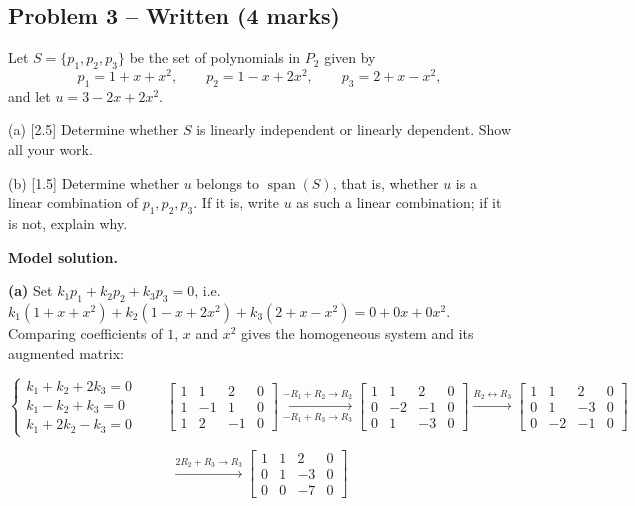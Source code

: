\documentclass[11pt,a4paper]{article}
\begin{document}
\subsection*{Problem 3 -- Written (4 marks)}
Let $S=\{p_1,p_2,p_3\}$ be the set of polynomials in $P_2$ given by\[p_1=1+x+x^{2},\qquad p_2=1-x+2x^{2},\qquad p_3=2+x-x^{2},\]and let $u=3-2x+2x^{2}$.\par (a) [2.5] Determine whether $S$ is linearly independent or linearly dependent. Show all your work.\par (b) [1.5] Determine whether $u$ belongs to $\operatorname{span}(S)$, that is, whether $u$ is a linear combination of $p_1,p_2,p_3$. If it is, write $u$ as such a linear combination; if it is not, explain why.\par
\textbf{Model solution.}\par{\color{WorkBlue}\textbf{(a)} Set $k_1p_1+k_2p_2+k_3p_3=0$, i.e. $k_1(1+x+x^{2})+k_2(1-x+2x^{2})+k_3(2+x-x^{2})=0+0x+0x^{2}$. Comparing coefficients of $1$, $x$ and $x^{2}$ gives the homogeneous system and its augmented matrix:

\[ \begin{cases}k_1+k_2+2k_3=0\\ k_1-k_2+k_3=0\\ k_1+2k_2-k_3=0\end{cases} \qquad \left[\begin{array}{ccc|c} 1 & 1 & 2 & 0 \\ 1 & -1 & 1 & 0 \\ 1 & 2 & -1 & 0 \end{array}\right] \xrightarrow[-R_1+R_3 \to R_3]{-R_1+R_2 \to R_2} \left[\begin{array}{ccc|c} 1 & 1 & 2 & 0 \\ 0 & -2 & -1 & 0 \\ 0 & 1 & -3 & 0 \end{array}\right] \xrightarrow{R_2 \leftrightarrow R_3} \left[\begin{array}{ccc|c} 1 & 1 & 2 & 0 \\ 0 & 1 & -3 & 0 \\ 0 & -2 & -1 & 0 \end{array}\right] \]

\[  \xrightarrow{2R_2+R_3 \to R_3} \left[\begin{array}{ccc|c} 1 & 1 & 2 & 0 \\ 0 & 1 & -3 & 0 \\ 0 & 0 & -7 & 0 \end{array}\right] \]

}
\end{document}
